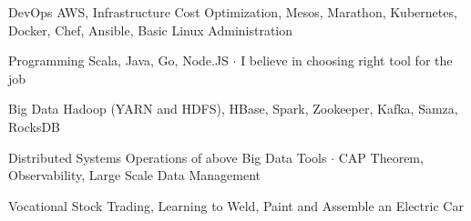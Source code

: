 

\begin{cvskills}

  \cvskill
    {DevOps} %
    {AWS, Infrastructure Cost Optimization, Mesos, Marathon, Kubernetes, Docker, Chef, Ansible, Basic Linux Administration} %

  \cvskill
    {Programming} %
    {Scala, Java, Go, Node.JS ${\cdotp}$ I believe in choosing right tool for the job} %

  \cvskill
    {Big Data} %
    {Hadoop (YARN and HDFS), HBase, Spark, Zookeeper, Kafka, Samza, RocksDB} %

  \cvskill
    {Distributed Systems} %
    {Operations of above Big Data Tools ${\cdotp}$ CAP Theorem, Observability, Large Scale Data Management} %

  \cvskill
    {Vocational} %
    {Stock Trading, Learning to Weld, Paint and Assemble an Electric Car} %

\end{cvskills}
